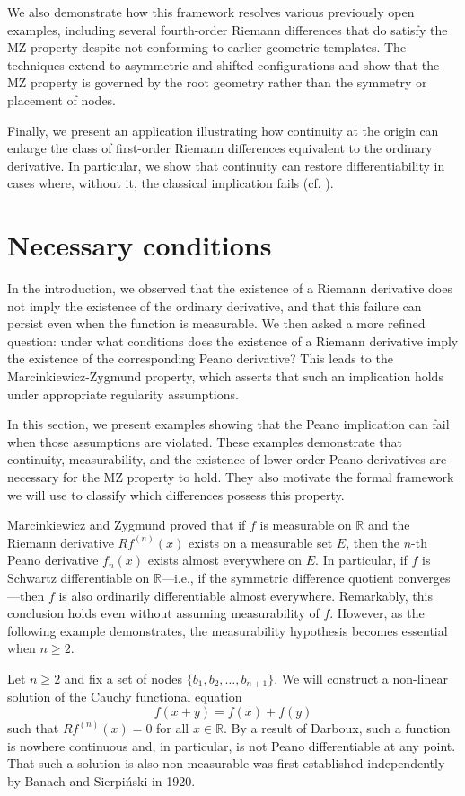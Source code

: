 \documentclass{raex}
\theoremstyle{definition}
\begin{document}
We also demonstrate how this framework resolves various previously open examples, including several fourth-order Riemann differences that do satisfy the MZ property despite not conforming to earlier geometric templates. The techniques extend to asymmetric and shifted configurations and show that the MZ property is governed by the root geometry rather than the symmetry or placement of nodes.

Finally, we present an application illustrating how continuity at the origin can enlarge the class of first-order Riemann differences equivalent to the ordinary derivative. In particular, we show that continuity can restore differentiability in cases where, without it, the classical implication fails (cf. \cite{ACC}).
\section{Necessary conditions}

In the introduction, we observed that the existence of a Riemann derivative does not imply the existence of the ordinary derivative, and that this failure can persist even when the function is measurable. We then asked a more refined question: under what conditions does the existence of a Riemann derivative imply the existence of the corresponding Peano derivative? This leads to the Marcinkiewicz-Zygmund property, which asserts that such an implication holds under appropriate regularity assumptions.

In this section, we present examples showing that the Peano implication can fail when those assumptions are violated. These examples demonstrate that continuity, measurability, and the existence of lower-order Peano derivatives are necessary for the MZ property to hold. They also motivate the formal framework we will use to classify which differences possess this property.

Marcinkiewicz and Zygmund proved that if $f$ is measurable on $\mathbb{R}$ and the Riemann derivative $Rf^{(n)}(x)$ exists on a measurable set $E$, then the $n$-th Peano derivative $f_n(x)$ exists almost everywhere on $E$. In particular, if $f$ is Schwartz differentiable on $\mathbb{R}$—i.e., if the symmetric difference quotient converges—then $f$ is also ordinarily differentiable almost everywhere. Remarkably, this conclusion holds even without assuming measurability of $f$. However, as the following example demonstrates, the measurability hypothesis becomes essential when $n \geq 2$.

Let $n \geq 2$ and fix a set of nodes $\{b_1, b_2, \ldots, b_{n+1}\}$. We will construct a non-linear solution of the Cauchy functional equation
\begin{equation} \label{ch1}
f(x+y) = f(x) + f(y)
\end{equation}
such that $Rf^{(n)}(x) = 0$ for all $x \in \mathbb{R}$. By a result of Darboux, such a function is nowhere continuous and, in particular, is not Peano differentiable at any point. That such a solution is also non-measurable was first established independently by Banach and Sierpiński in 1920.
\end{document}
